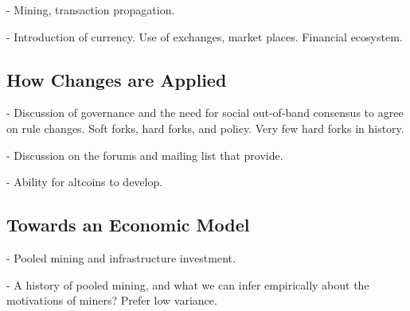 - Mining, transaction propagation.

- Introduction of currency. Use of exchanges, market places. Financial ecosystem.

\subsection{How Changes are Applied}

- Discussion of governance and the need for social out-of-band consensus to agree on rule changes. Soft forks, hard forks, and policy. Very few hard forks in history.

- Discussion on the forums and mailing list that provide.

- Ability for altcoins to develop.

\subsection{Towards an Economic Model}

- Pooled mining and infrastructure investment.

- A history of pooled mining, and what we can infer empirically about the motivations of miners? Prefer low variance.

